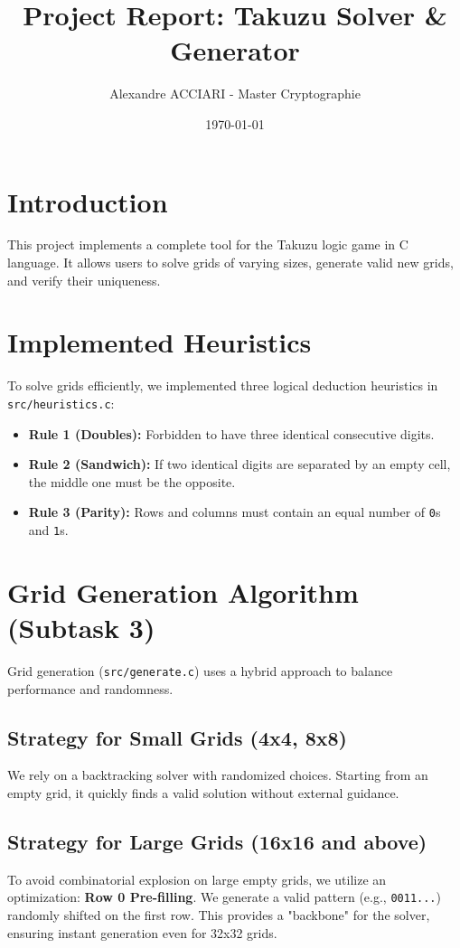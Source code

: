 \documentclass[a4paper,11pt]{article}
\title{\textbf{Project Report: Takuzu Solver \& Generator}}
\author{Alexandre ACCIARI - Master Cryptographie}
\date{\today}
\begin{document}
\maketitle
\tableofcontents
\newpage

\section{Introduction}
This project implements a complete tool for the Takuzu logic game in C language. It allows users to solve grids of varying sizes, generate valid new grids, and verify their uniqueness.

\section{Implemented Heuristics}
To solve grids efficiently, we implemented three logical deduction heuristics in \texttt{src/heuristics.c}:
\begin{itemize}
    \item \textbf{Rule 1 (Doubles):} Forbidden to have three identical consecutive digits.
    \item \textbf{Rule 2 (Sandwich):} If two identical digits are separated by an empty cell, the middle one must be the opposite.
    \item \textbf{Rule 3 (Parity):} Rows and columns must contain an equal number of \texttt{0}s and \texttt{1}s.
\end{itemize}

\section{Grid Generation Algorithm (Subtask 3)}
Grid generation (\texttt{src/generate.c}) uses a hybrid approach to balance performance and randomness.

\subsection{Strategy for Small Grids (4x4, 8x8)}
We rely on a backtracking solver with randomized choices. Starting from an empty grid, it quickly finds a valid solution without external guidance.

\subsection{Strategy for Large Grids (16x16 and above)}
To avoid combinatorial explosion on large empty grids, we utilize an optimization: \textbf{Row 0 Pre-filling}. We generate a valid pattern (e.g., \texttt{0011...}) randomly shifted on the first row. This provides a "backbone" for the solver, ensuring instant generation even for 32x32 grids.
\end{document}
